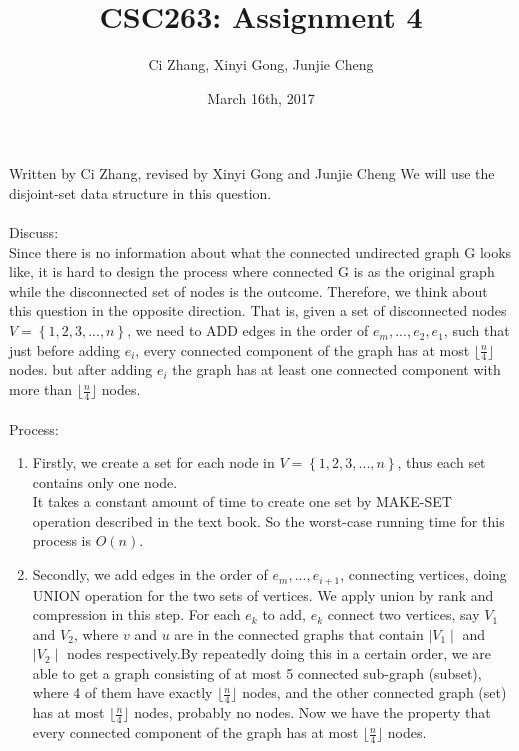 \documentclass[11pt, answers]{exam}
\newcommand\floor[1]{\lfloor#1\rfloor}
\theoremstyle{plain}
\theoremstyle{definition}
\begin{document}
 


\title{CSC263: Assignment 4}
\date{March 16th, 2017}
\author{Ci Zhang, Xinyi Gong, Junjie Cheng}
\maketitle

\unframedsolutions

\begin{questions}
\question
\begin{solution}Written by Ci Zhang, revised by Xinyi Gong and Junjie Cheng
We will use the disjoint-set data structure in this question. \\
\\
Discuss: \\
Since there is no information about what the connected undirected graph G looks like, it is hard to design the process where connected G is as the original graph while the disconnected set of nodes is the outcome. Therefore, we think about this question in the opposite direction. That is, given a set of disconnected nodes $V =\left\{ {1,2,3,...,n}\right\}$, we need to ADD edges in the order of $ e_m,...,e_2,e_1 $, such that just before adding $e_i$, every connected component of the graph has at most $\floor{\frac{n}{4}}$ nodes. but after adding $e_i$ the graph has at least one connected component with more than $\floor{\frac{n}{4}}$ nodes.\\
\\
Process:
\begin{enumerate}
  \item Firstly, we create a set for each node in $V =\left\{ {1,2,3,...,n}\right\}$, thus each set contains only one node.\\
  It takes a constant amount of time to create one set by MAKE-SET operation described in the text book. So the worst-case running time for this process is $O(n)$.
  \item Secondly, we add edges in the order of $ e_m,...,e_{i+1} $, connecting vertices, doing UNION operation for the two sets of vertices. We apply union by rank and compression in this step. For each $e_k$ to add, $e_k$ connect two vertices, say $V_1$ and $V_2$, where $v$ and $u$ are in the connected graphs that contain $\mid V_1\mid$ and $\mid V_2\mid$ nodes respectively.By repeatedly doing this in a certain order, we are able to get a graph consisting of at most 5 connected sub-graph (subset), where 4 of them have exactly $\floor{\frac{n}{4}}$ nodes, and the other connected graph (set) has at most $\floor{\frac{n}{4}}$ nodes, probably no nodes. Now we have the property that every connected component of the graph has at most $\floor{\frac{n}{4}}$ nodes.

\end{enumerate}
\end{solution}
\end{questions}
\end{document}
